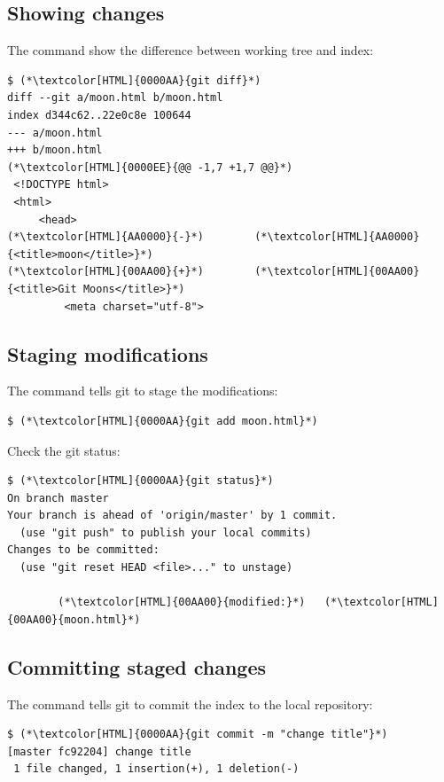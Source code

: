 \subsection{Showing changes}
\begin{frame}[fragile]
  \subslidetitle

  The command  show the difference between working tree and index:
  \begin{lstlisting}
$ (*\textcolor[HTML]{0000AA}{git diff}*)
diff --git a/moon.html b/moon.html
index d344c62..22e0c8e 100644
--- a/moon.html
+++ b/moon.html
(*\textcolor[HTML]{0000EE}{@@ -1,7 +1,7 @@}*)
 <!DOCTYPE html>
 <html>
     <head>
(*\textcolor[HTML]{AA0000}{-}*)        (*\textcolor[HTML]{AA0000}{<title>moon</title>}*)
(*\textcolor[HTML]{00AA00}{+}*)        (*\textcolor[HTML]{00AA00}{<title>Git Moons</title>}*)
         <meta charset="utf-8">
\end{lstlisting}
\end{frame}

\subsection{Staging modifications}
\begin{frame}[fragile]
  \subslidetitle

  The command  tells git to stage the modifications:
  \begin{lstlisting}
$ (*\textcolor[HTML]{0000AA}{git add moon.html}*)
\end{lstlisting}

  Check the git status:
  \begin{lstlisting}
$ (*\textcolor[HTML]{0000AA}{git status}*)
On branch master
Your branch is ahead of 'origin/master' by 1 commit.
  (use "git push" to publish your local commits)
Changes to be committed:
  (use "git reset HEAD <file>..." to unstage)

        (*\textcolor[HTML]{00AA00}{modified:}*)   (*\textcolor[HTML]{00AA00}{moon.html}*)
\end{lstlisting}
\end{frame}

\subsection{Committing staged changes}
\begin{frame}[fragile]
  \subslidetitle

  The command  tells git to commit the index to the local repository:
  \begin{lstlisting}
$ (*\textcolor[HTML]{0000AA}{git commit -m "change title"}*)
[master fc92204] change title
 1 file changed, 1 insertion(+), 1 deletion(-)
\end{lstlisting}
\end{frame}

